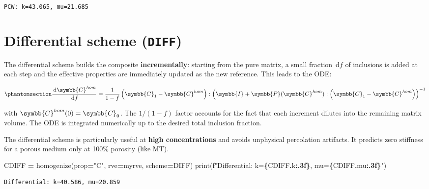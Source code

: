 \documentclass[
  a4paper,
  numbers=noendperiod,
  DIV=12]{scrreprt}
\newenvironment{Shaded}{\begin{snugshade}}{\end{snugshade}}
\newcommand{\BuiltInTok}[1]{#1}
\newcommand{\NormalTok}[1]{#1}
\newcommand{\OperatorTok}[1]{\textcolor[rgb]{0.81,0.36,0.00}{\textbf{#1}}}
\newcommand{\SpecialCharTok}[1]{\textcolor[rgb]{0.81,0.36,0.00}{\textbf{#1}}}
\newcommand{\SpecialStringTok}[1]{\textcolor[rgb]{0.31,0.60,0.02}{#1}}
\newcommand{\StringTok}[1]{\textcolor[rgb]{0.31,0.60,0.02}{#1}}
\newcommand{\uuuu}[1]{{\symbb{{#1}}}}
\newcommand{\ud}{{\,\mathrm{d}}}
\begin{document}
\begin{verbatim}
PCW: k=43.065, mu=21.685
\end{verbatim}

\section{\texorpdfstring{Differential scheme
(\texttt{DIFF})}{Differential scheme (DIFF)}}\label{sec-DIFF}

The differential scheme builds the composite \textbf{incrementally}:
starting from the pure matrix, a small fraction \(\ud f\) of inclusions
is added at each step and the effective properties are immediately
updated as the new reference. This leads to the ODE:

\begin{equation}\protect\phantomsection\label{eq-DIFF-ode}{
\frac{\ud\uuuu{C}^{hom}}{\ud f} = \frac{1}{1-f} \left(\uuuu{C}_1 - \uuuu{C}^{hom}\right) : \left(\uuuu{I} + \uuuu{P}(\uuuu{C}^{hom}) : \left(\uuuu{C}_1 - \uuuu{C}^{hom}\right)\right)^{-1}
}\end{equation}

with \(\uuuu{C}^{hom}(0) = \uuuu{C}_0\). The \(1/(1-f)\) factor accounts
for the fact that each increment dilutes into the remaining matrix
volume. The ODE is integrated numerically up to the desired total
inclusion fraction.

The differential scheme is particularly useful at \textbf{high
concentrations} and avoids unphysical percolation artifacts. It predicts
zero stiffness for a porous medium only at 100\% porosity (like MT).

\begin{Shaded}
\begin{Highlighting}[]
\NormalTok{CDIFF }\OperatorTok{=}\NormalTok{ homogenize(prop}\OperatorTok{=}\StringTok{"C"}\NormalTok{, rve}\OperatorTok{=}\NormalTok{myrve, scheme}\OperatorTok{=}\NormalTok{DIFF)}
\BuiltInTok{print}\NormalTok{(}\SpecialStringTok{f"Differential: k=}\SpecialCharTok{\{}\NormalTok{CDIFF}\SpecialCharTok{.}\NormalTok{k}\SpecialCharTok{:.3f\}}\SpecialStringTok{, mu=}\SpecialCharTok{\{}\NormalTok{CDIFF}\SpecialCharTok{.}\NormalTok{mu}\SpecialCharTok{:.3f\}}\SpecialStringTok{"}\NormalTok{)}
\end{Highlighting}
\end{Shaded}

\begin{verbatim}
Differential: k=40.586, mu=20.859
\end{verbatim}
\end{document}
